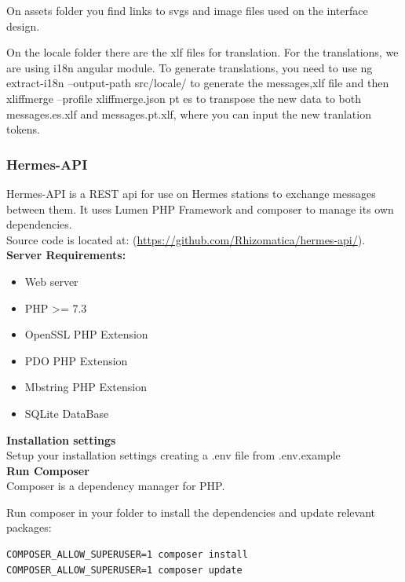 \documentclass[11pt,a4paper]{article}
\begin{document}
On assets folder you find links to svgs and image files used on the interface design.

On the locale folder there are the xlf files for translation. For the translations, we are using i18n angular module. To generate translations, you need to use ng extract-i18n --output-path src/locale/ to generate the messages,xlf file and then xliffmerge --profile xliffmerge.json pt es to transpose the new data to both messages.es.xlf and messages.pt.xlf, where you can input the new tranlation tokens.

\subsubsection{Hermes-API}
Hermes-API is a REST api for use on Hermes stations to exchange messages between them.
It uses Lumen PHP Framework and composer to manage its own dependencies.\\

Source code is located at:
(\url{https://github.com/Rhizomatica/hermes-api/}).\\

\textbf{Server Requirements:}
\begin{itemize}
  \item Web server
  \item PHP >= 7.3
  \item OpenSSL PHP Extension
  \item PDO PHP Extension
  \item Mbstring PHP Extension
  \item SQLite DataBase\\
\end{itemize}

\textbf{Installation settings}\\

Setup your installation settings creating a .env file from .env.example\\

\textbf{Run Composer}\\

Composer is a dependency manager for PHP.

Run composer in your folder to install the dependencies and update relevant packages:
\begin{verbatim}
COMPOSER_ALLOW_SUPERUSER=1 composer install
COMPOSER_ALLOW_SUPERUSER=1 composer update

\end{verbatim}
\end{document}
